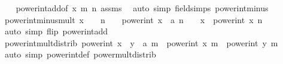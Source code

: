 \begin{isabellebody}
%
\isadelimproof
\ \ %
\endisadelimproof
%
\isatagproof
{}\isamarkupfalse%
\ power{\isacharunderscore}{\kern0pt}int{\isacharunderscore}{\kern0pt}add{\isacharbrackleft}{\kern0pt}of\ x\ m\ {\isachardoublequoteopen}{\isacharminus}{\kern0pt}n{\isachardoublequoteclose}{\isacharbrackright}{\kern0pt}\ assms\ \isamarkupfalse%
\ {\isacharparenleft}{\kern0pt}auto\ simp{\isacharcolon}{\kern0pt}\ field{\isacharunderscore}{\kern0pt}simps\ power{\isacharunderscore}{\kern0pt}int{\isacharunderscore}{\kern0pt}minus{\isacharparenright}{\kern0pt}%
\endisatagproof
{\isafoldproof}%
%
\isadelimproof
\isanewline
%
\endisadelimproof
\isanewline
{}\isamarkupfalse%
\ power{\isacharunderscore}{\kern0pt}int{\isacharunderscore}{\kern0pt}minus{\isacharunderscore}{\kern0pt}mult{\isacharcolon}{\kern0pt}\ {\isachardoublequoteopen}x\ {\isasymnoteq}\ {}\ {\isasymor}\ n\ {\isasymnoteq}\ {}\ {\isasymLongrightarrow}\ power{\isacharunderscore}{\kern0pt}int\ {\isacharparenleft}{\kern0pt}x\ {\isacharcolon}{\kern0pt}{\isacharcolon}{\kern0pt}\ {\isacharprime}{\kern0pt}a{\isacharparenright}{\kern0pt}\ {\isacharparenleft}{\kern0pt}n\ {\isacharminus}{\kern0pt}\ {}{\isacharparenright}{\kern0pt}\ {\isacharasterisk}{\kern0pt}\ x\ {\isacharequal}{\kern0pt}\ power{\isacharunderscore}{\kern0pt}int\ x\ n{\isachardoublequoteclose}\isanewline
%
\isadelimproof
\ \ %
\endisadelimproof
%
\isatagproof
{}\isamarkupfalse%
\ {\isacharparenleft}{\kern0pt}auto\ simp\ flip{\isacharcolon}{\kern0pt}\ power{\isacharunderscore}{\kern0pt}int{\isacharunderscore}{\kern0pt}add{\isacharunderscore}{\kern0pt}{}{\isacharparenright}{\kern0pt}%
\endisatagproof
{\isafoldproof}%
%
\isadelimproof
\ \ \isanewline
%
\endisadelimproof
\isanewline
{}\isamarkupfalse%
\ power{\isacharunderscore}{\kern0pt}int{\isacharunderscore}{\kern0pt}mult{\isacharunderscore}{\kern0pt}distrib{\isacharcolon}{\kern0pt}\ {\isachardoublequoteopen}power{\isacharunderscore}{\kern0pt}int\ {\isacharparenleft}{\kern0pt}x\ {\isacharasterisk}{\kern0pt}\ y\ {\isacharcolon}{\kern0pt}{\isacharcolon}{\kern0pt}\ {\isacharprime}{\kern0pt}a{\isacharparenright}{\kern0pt}\ m\ {\isacharequal}{\kern0pt}\ power{\isacharunderscore}{\kern0pt}int\ x\ m\ {\isacharasterisk}{\kern0pt}\ power{\isacharunderscore}{\kern0pt}int\ y\ m{\isachardoublequoteclose}\isanewline
%
\isadelimproof
\ \ %
\endisadelimproof
%
\isatagproof
{}\isamarkupfalse%
\ {\isacharparenleft}{\kern0pt}auto\ simp{\isacharcolon}{\kern0pt}\ power{\isacharunderscore}{\kern0pt}int{\isacharunderscore}{\kern0pt}def\ power{\isacharunderscore}{\kern0pt}mult{\isacharunderscore}{\kern0pt}distrib{\isacharparenright}{\kern0pt}%

\end{isabellebody}
